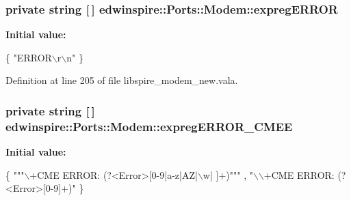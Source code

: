 \hypertarget{classedwinspire_1_1Ports_1_1Modem_a439d82c1165b6af0f182fbae8ec9f051}{
\subsubsection[{expreg\-E\-R\-R\-O\-R}]{\setlength{\rightskip}{0pt plus 5cm}private string \mbox{[}$\,$\mbox{]} edwinspire\-::\-Ports\-::\-Modem\-::expreg\-E\-R\-R\-O\-R\hspace{0.3cm}{\ttfamily [private]}}}\label{classedwinspire_1_1Ports_1_1Modem_a439d82c1165b6af0f182fbae8ec9f051}
{\bfseries Initial value\-:}
\begin{DoxyCode}
 \{
                                \textcolor{stringliteral}{"ERROR\(\backslash\)r\(\backslash\)n"}
                        \}
\end{DoxyCode}


Definition at line 205 of file libspire\-\_\-modem\-\_\-new.\-vala.

\hypertarget{classedwinspire_1_1Ports_1_1Modem_ab314b7affec099cfde591b6974d233a1}{
\subsubsection[{expreg\-E\-R\-R\-O\-R\-\_\-\-C\-M\-E\-E}]{\setlength{\rightskip}{0pt plus 5cm}private string \mbox{[}$\,$\mbox{]} edwinspire\-::\-Ports\-::\-Modem\-::expreg\-E\-R\-R\-O\-R\-\_\-\-C\-M\-E\-E\hspace{0.3cm}{\ttfamily [private]}}}\label{classedwinspire_1_1Ports_1_1Modem_ab314b7affec099cfde591b6974d233a1}
{\bfseries Initial value\-:}
\begin{DoxyCode}
 \{
                                \textcolor{stringliteral}{""}\textcolor{stringliteral}{"\(\backslash\)+CME ERROR: (?<Error>[0-9|a-z|AZ|\(\backslash\)w| ]+)"}\textcolor{stringliteral}{""}
      ,
                                \textcolor{stringliteral}{"\(\backslash\)\(\backslash\)+CME ERROR: (?<Error>[0-9]+)"}
                        \}
\end{DoxyCode}


